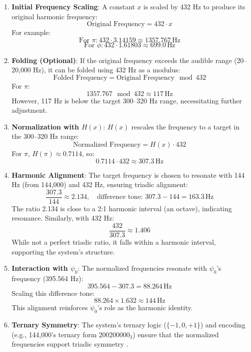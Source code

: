 \begin{enumerate}
    \item \textbf{Initial Frequency Scaling}: A constant \( x \) is scaled by 432 Hz to produce its original harmonic frequency:
    \[
    \text{Original Frequency} = 432 \cdot x
    \]
    For example:
    \[
    \text{For } \pi: 432 \cdot 3.14159 \approx 1357.767 \, \text{Hz}
    \]
    \[
    \text{For } \phi: 432 \cdot 1.61803 \approx 699.0 \, \text{Hz}
    \]

    \item \textbf{Folding (Optional)}: If the original frequency exceeds the audible range (20--20,000 Hz), it can be folded using 432 Hz as a modulus:
    \[
    \text{Folded Frequency} = \text{Original Frequency} \mod 432
    \]
    For \( \pi \):
    \[
    1357.767 \mod 432 \approx 117 \, \text{Hz}
    \]
    However, 117 Hz is below the target 300--320 Hz range, necessitating further adjustment.

    \item \textbf{Normalization with \( H(x) \)}: \( H(x) \) rescales the frequency to a target in the 300--320 Hz range:
    \[
    \text{Normalized Frequency} = H(x) \cdot 432
    \]
    For \( \pi \), \( H(\pi) \approx 0.7114 \), so:
    \[
    0.7114 \cdot 432 \approx 307.3 \, \text{Hz}
    \]

    \item \textbf{Harmonic Alignment}: The target frequency is chosen to resonate with 144 Hz (from 144,000) and 432 Hz, ensuring triadic alignment:
    \[
    \frac{307.3}{144} \approx 2.134, \quad \text{difference tone: } 307.3 - 144 = 163.3 \, \text{Hz}
    \]
    The ratio 2.134 is close to a 2:1 harmonic interval (an octave), indicating resonance. Similarly, with 432 Hz:
    \[
    \frac{432}{307.3} \approx 1.406
    \]
    While not a perfect triadic ratio, it falls within a harmonic interval, supporting the system’s structure.

    \item \textbf{Interaction with \( \psi_0 \)}: The normalized frequencies resonate with \( \psi_0 \)’s frequency (395.564 Hz):
    \[
    395.564 - 307.3 = 88.264 \, \text{Hz}
    \]
    Scaling this difference tone:
    \[
    88.264 \times 1.632 \approx 144 \, \text{Hz}
    \]
    This alignment reinforces \( \psi_0 \)’s role as the harmonic identity.

    \item \textbf{Ternary Symmetry}: The system’s ternary logic (\( \{-1, 0, +1\} \)) and encoding (e.g., 144,000’s ternary form \( 200200000_3 \)) ensure that the normalized frequencies support triadic symmetry \cite{harmonic_reversible}.
\end{enumerate}

